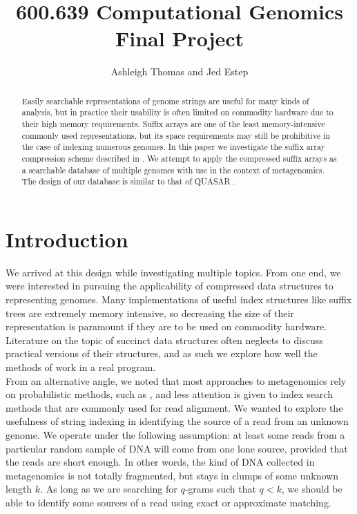 \documentclass{article}
\begin{document}
\title{600.639 Computational Genomics\\
Final Project}
\date{}
\author{Ashleigh Thomas and Jed Estep}
\maketitle

\begin{abstract}
Easily searchable representations of genome strings are useful for many kinds of analysis, but in practice their usability is often limited on commodity hardware due to their high memory requirements. Suffix arrays are one of the least memory-intensive commonly used representations, but its space requirements may still be prohibitive in the case of indexing numerous genomes. In this paper we investigate the suffix array compression scheme described in \cite{GV05}. We attempt to apply the compressed suffix arrays as a searchable database of multiple genomes with use in the context of metagenomics. The design of our database is similar to that of QUASAR \cite{B99}.
\end{abstract}
\section{Introduction}
\label{sec-intro}
\indent We arrived at this design while investigating multiple topics. From one end, we were interested in pursuing the applicability of compressed data structures to representing genomes. Many implementations of useful index structures like suffix trees are extremely memory intensive, so decreasing the size of their representation is paramount if they are to be used on commodity hardware. Literature on the topic of succinct data structures often neglects to discuss practical versions of their structures, and as such we explore how well the methods of \cite{GV05} work in a real program.\\
\indent From an alternative angle, we noted that most approaches to metagenomics rely on probabilistic methods, such as \cite{BS09}, and less attention is given to index search methods that are commonly used for read alignment. We wanted to explore the usefulness of string indexing in identifying the source of a read from an unknown genome. We operate under the following assumption: at least some reads from a particular random sample of DNA will come from one lone source, provided that the reads are short enough. In other words, the kind of DNA collected in metagenomics is not totally fragmented, but stays in clumps of some unknown length $k$. As long as we are searching for $q$-grams such that $q < k$, we should be able to identify some sources of a read using exact or approximate matching.\\
\end{document}
